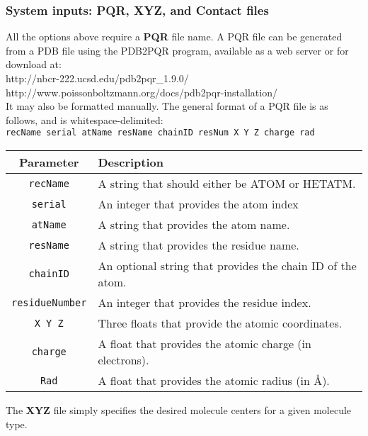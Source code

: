 \clearpage

\subsubsection{System inputs: PQR, XYZ, and Contact files}

All the options above require a \textbf{PQR} file name. A PQR file can be generated from a PDB file using the PDB2PQR program, available as a web server or for download at: \\

http://nbcr-222.ucsd.edu/pdb2pqr\_1.9.0/  \\
http://www.poissonboltzmann.org/docs/pdb2pqr-installation/ \\

It may also be formatted manually. The general format of a PQR file is as follows, and is whitespace-delimited: \\

\texttt{recName  serial  atName  resName  chainID  resNum  X  Y  Z  charge rad }\\

  \begin{tabular}{ c | l  }
    \textbf{Parameter} & \textbf{Description} \\ \hline
\texttt{recName} 	&	A string that should either be ATOM or HETATM. \\
\texttt{serial} 	&	An integer that provides the atom index \\
\texttt{atName} 	&	A string that provides the atom name.\\
\texttt{resName}	&	A string that provides the residue name. \\
\texttt{chainID}	&	An optional string that provides the chain ID of the atom.\\
\texttt{residueNumber}  & An integer that provides the residue index.\\
\texttt{X Y Z}	& Three floats that provide the atomic coordinates.\\
\texttt{charge}	& A float that provides the atomic charge (in electrons). \\
\texttt{Rad}		& A float that provides the atomic radius (in \AA).\\
    \hline
  \end{tabular}

\medskip\medskip\medskip \medskip

The \textbf{XYZ} file simply specifies the desired molecule centers for a given molecule type. \\

